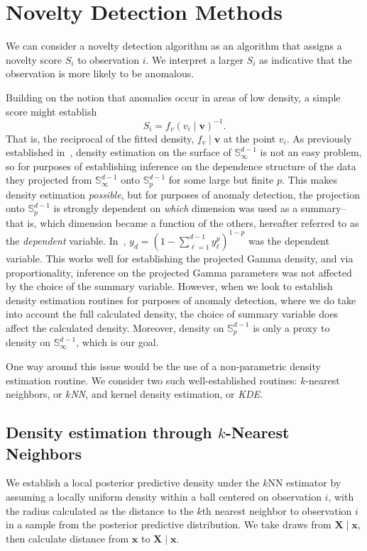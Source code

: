 \section{Novelty Detection Methods}
We can consider a novelty detection algorithm as an algorithm that assigns a
  novelty score $S_i$ to observation $i$.  We interpret a larger $S_i$ 
  as indicative that the observation is more likely to be anomalous.

Building on the notion that anomalies occur in areas of low density, a simple
  score might establish
  \[
      S_i = f_v(v_i\mid \bm{v})^{-1}.  
  \]
  That is, the reciprocal of the fitted density, $f_v\mid \bm{v}$ at the point $v_i$.
  As previously established in~\cite{trubey:pg}, density estimation on the 
  surface of ${\mathbb S}_{\infty}^{d-1}$ is not an easy problem, so for 
  purposes of establishing inference on the dependence structure of the data 
  they projected from ${\mathbb S}_{\infty}^{d-1}$ onto ${\mathbb S}_p^{d-1}$ for 
  some large but finite $p$.  This makes density estimation \emph{possible}, but 
  for purposes of anomaly detection, the projection onto ${\mathbb S}_p^{d-1}$ is 
  strongly dependent on \emph{which} dimension was used as a summary--that is, 
  which dimension became a function of the others, hereafter referred to as the 
  \emph{dependent} variable. In~\cite{trubey:pg}, 
  $y_d = (1 - \sum_{\ell = 1}^{d-1}y_{\ell}^p)^{1-p}$ was the dependent variable.
  This works well for establishing the projected Gamma density, and via 
  proportionality, inference on the projected Gamma parameters was not affected
  by the choice of the summary variable. However, when we look to establish 
  density estimation routines for purposes of anomaly detection, where we do 
  take into account the full calculated density, the choice of summary variable 
  does affect the calculated density.  Moreover, density on $\mathbb{S}_p^{d-1}$
  is only a proxy to density on $\mathbb{S}_{\infty}^{d-1}$, which is our goal.

One way around this issue would be the use of a non-parametric density estimation
  routine.  We consider two such well-established routines: $k$-nearest neighbors, 
  or \emph{$k$NN}, and kernel density estimation, or \emph{KDE}.

\subsection{Density estimation through $k$-Nearest Neighbors}
We establish a local posterior predictive density under the $k$NN estimator by 
  assuming a locally uniform density within a ball centered on observation $i$,
  with the radius calculated as the distance to the $k$th nearest neighbor to
  observation $i$ in a sample from the posterior predictive distribution.  We
  take draws from $\bm{X}\mid \bm{x}$, then calculate distance from $\bm{x}$ to 
  $\bm{X}\mid \bm{x}$.

